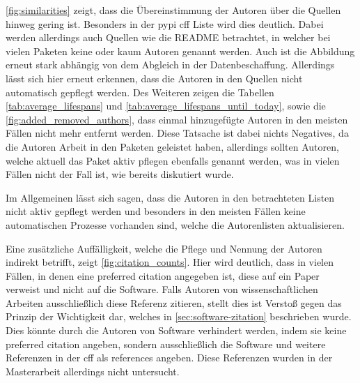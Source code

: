 \autoref{fig:similarities} zeigt, dass die Übereinstimmung der Autoren über die Quellen hinweg gering ist.
Besonders in der \gls{pypi} \gls{cff} Liste wird dies deutlich.
Dabei werden allerdings auch Quellen wie die README betrachtet, in welcher bei vielen Paketen keine oder kaum Autoren genannt werden.
Auch ist die Abbildung erneut stark abhängig von dem Abgleich in der Datenbeschaffung.
Allerdings lässt sich hier erneut erkennen, dass die Autoren in den Quellen nicht automatisch gepflegt werden.
Des Weiteren zeigen die Tabellen \ref{tab:average_lifespans} und \ref{tab:average_lifespans_until_today}, sowie die \autoref{fig:added_removed_authors}, dass einmal hinzugefügte Autoren in den meisten Fällen nicht mehr entfernt werden.
Diese Tatsache ist dabei nichts Negatives, da die Autoren Arbeit in den Paketen geleistet haben, allerdings sollten Autoren, welche aktuell das Paket aktiv pflegen ebenfalls genannt werden, was in vielen Fällen nicht der Fall ist, wie bereits diskutiert wurde.

Im Allgemeinen lässt sich sagen, dass die Autoren in den betrachteten Listen nicht aktiv gepflegt werden und besonders in den meisten Fällen keine automatischen Prozesse vorhanden sind, welche die Autorenlisten aktualisieren.

Eine zusätzliche Auffälligkeit, welche die Pflege und Nennung der Autoren indirekt betrifft, zeigt \autoref{fig:citation_counts}.
Hier wird deutlich, dass in vielen Fällen, in denen eine \glqq preferred citation\grqq{} angegeben ist, diese auf ein Paper verweist und nicht auf die Software.
Falls Autoren von wissenschaftlichen Arbeiten ausschließlich diese Referenz zitieren, stellt dies ist Verstoß gegen das Prinzip der Wichtigkeit dar, welches in \autoref{sec:software-zitation} beschrieben wurde.
Dies könnte durch die Autoren von Software verhindert werden, indem sie keine \glqq preferred citation\grqq{} angeben, sondern ausschließlich die Software und weitere Referenzen in der \gls{cff} als \glqq references\grqq{} angeben.
Diese Referenzen wurden in der Masterarbeit allerdings nicht untersucht.
